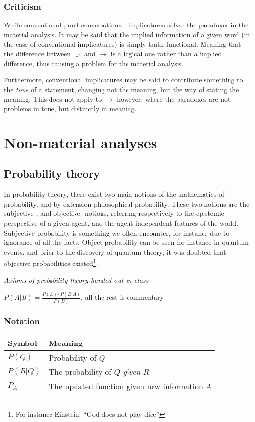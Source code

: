 \documentclass[12pt]{report}
\begin{document}
\subsection{Criticism}

While conventional-, and conversational- implicatures solves the paradoxes in
the material analysis. It may be said that the implied information of a given
word (in the case of conventional implicatures) is simply truth-functional.
Meaning that the difference between $\supset$ and $\rightarrow$ is a logical one
rather than a implied difference, thus causing a problem for the material
analysis.

Furthermore, conventional implicatures may be said to contribute something to the
\emph{tone} of a statement, changing not the meaning, but the way of stating the
meaning. This does not apply to $\rightarrow$ however, where the paradoxes are
not problems in tone, but distinctly in meaning.

\chapter{Non-material analyses}

\section{Probability theory}

In probability theory, there exist two main notions of the mathematics of
probability, and by extension philosophical probability. These two notions are
the subjective-, and objective- notions, referring respectively to the epistemic
perspective of a given agent, and the agent-independent features of the world.
Subjective probability is something we often encounter, for instance due to
ignorance of all the facts. Object probability can be seen for instance in
quantum events, and prior to the discovery of quantum theory, it was doubted
that objective probabilities existed\footnote{For instance Einstein: ``God does
not play dice''}.

\begin{center}
	\textit{Axioms of probability theory handed out in class}
\end{center}

$P(A|B) = \frac{P(A) \cdot P(B|A)}{P(B)}$, all the rest is commentary

\subsection{Notation}
\begin{tabular}{l|l}
Symbol & Meaning \\
\hline
$P(Q)$ & Probability of $Q$\\
$P(R|Q)$ & The probability of $Q$ \emph{given} $R$\\
$P_A$ & The updated function given new information $A$\\
\end{tabular}
\end{document}
